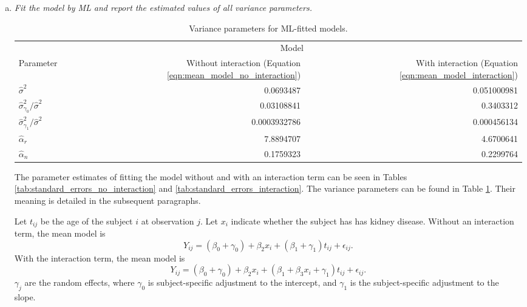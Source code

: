 \documentclass[11pt, letterpaper]{article}
\begin{document}
\begin{enumerate}[(a)]
\item {\em Fit the model by ML and
report the
estimated values of all variance parameters. }

\begin{table}
  \centering
  \begin{tabular}{lrr}
    \toprule
    & \multicolumn{2}{c}{Model} \\
    Parameter & Without interaction (Equation \ref{eqn:mean_model_no_interaction}) & With interaction (Equation \ref{eqn:mean_model_interaction}) \\
    \midrule
    $\hat{\sigma}^2$ & 0.0693487 & 0.051000981 \\
    $\hat{\sigma}^2_{\gamma_0}/\hat{\sigma}^2$ & 0.03108841 & 0.3403312 \\
    $\hat{\sigma}^2_{\gamma_1}/\hat{\sigma}^2$ & 0.0003932786 & 0.000456134 \\
    $\hat{\alpha}_r$ & 7.8894707 & 4.6700641 \\
    $\hat{\alpha}_n$ & 0.1759323  & 0.2299764 \\
    \bottomrule
  \end{tabular}
  \caption{Variance parameters for ML-fitted models.}
  \label{tab:variance_parameters}
\end{table}

\begin{description}
  The parameter estimates of fitting the model without and with an interaction
  term can be seen in Tables \ref{tab:standard_errors_no_interaction} and
  \ref{tab:standard_errors_interaction}. The variance parameters can be found in
  Table \ref{tab:variance_parameters}. Their meaning is detailed in the
  subsequent paragraphs.

  Let $t_{ij}$ be the age of the subject $i$ at observation $j$. Let $x_i$
  indicate whether the subject has has kidney disease. Without an interaction
  term, the mean model is
  \begin{equation}
    Y_{ij} = \left(\beta_0 + \gamma_0\right) +
    \beta_2x_i +
    \left(\beta_1 + \gamma_1\right)t_{ij} + \epsilon_{ij}.
    \label{eqn:mean_model_no_interaction}
  \end{equation}
  With the interaction term, the mean model is
  \begin{equation}
    Y_{ij} = \left(\beta_0 + \gamma_0\right) +
    \beta_2x_i +
    \left(\beta_1 + \beta_3x_i +\gamma_1\right)t_{ij} + \epsilon_{ij}.
    \label{eqn:mean_model_interaction}
  \end{equation}
  $\gamma_j$ are the random effects, where $\gamma_0$ is subject-specific
  adjustment to the intercept, and $\gamma_1$ is the subject-specific adjustment
  to the slope.
  

\end{description}
\end{enumerate}
\end{document}
